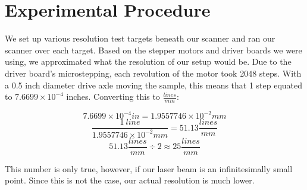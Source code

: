 \documentclass[letterpaper, 12pt]{article}
\begin{document}
\section{Experimental Procedure}
\par
We set up various resolution test targets beneath our scanner and ran our scanner over each target. Based on the stepper motors and driver boards we were using\footnotemark, we approximated what the resolution of our setup would be.
Due to the driver board's microstepping, each revolution of the motor took 2048 steps. With a 0.5 inch diameter drive axle moving the sample, this means that 1 step equated to \( 7.6699 \times 10^{-4} \) inches. Converting this to \( \frac{lines}{mm}\):

\[ 7.6699\times10^{-4}in = 1.9557746\times10^{-2}mm \]
\[ \frac{1\ line}{1.9557746\times10^{-2}mm} = 51.13\frac{lines}{mm}\]
\[ 51.13\frac{lines}{mm} \div 2 \approx 25\frac{lines}{mm} \]

\par
This number is only true, however, if our laser beam is an infinitesimally small point. Since this is not the case, our actual resolution is much lower.
\end{document}
